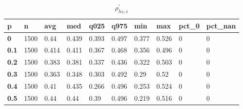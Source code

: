 \begin{table}[h]
 \centering 
\footnotesize
\caption{$\rho_{hs,s}^\prime $}
\label{tab:alphahss}
\begin{tabular}[h]{|l|l|l|l|l|l|l|l|l|l|
    } \hline
\textbf{ p} & \textbf{ n} & \textbf{ avg} & \textbf{ med} & \textbf{ q025} & \textbf{ q975} & \textbf{ min} & \textbf{ max} & \textbf{ pct\_0} & \textbf{ pct\_nan}
    \\ \hline
  \textbf{  0} & 1500 &  0.44 & 0.439 & 0.393 & 0.497 & 0.377 & 0.526 & 0 & 0
    \\ \hline
  \textbf{0.1} & 1500 & 0.414 & 0.411 & 0.367 & 0.468 & 0.356 & 0.496 & 0 & 0
    \\ \hline
  \textbf{0.2} & 1500 & 0.383 & 0.381 & 0.337 & 0.436 & 0.322 & 0.503 & 0 & 0
    \\ \hline
  \textbf{0.3} & 1500 & 0.363 & 0.348 & 0.303 & 0.492 &  0.29 &  0.52 & 0 & 0
    \\ \hline
  \textbf{0.4} & 1500 &  0.41 & 0.435 & 0.266 & 0.496 & 0.253 & 0.524 & 0 & 0
    \\ \hline
  \textbf{0.5} & 1500 &  0.44 &  0.44 &  0.39 & 0.496 & 0.219 & 0.516 & 0 & 0
    \\ \hline
 \end{tabular}
 \end{table}
